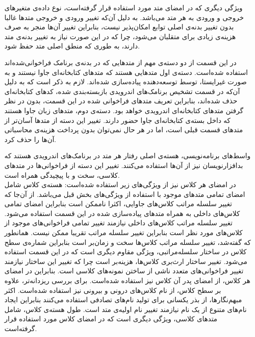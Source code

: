  ویژگی دیگری که در امضای متد مورد استفاده قرار گرفته‌است، نوع داده‌ی متغیر‌های خروجی و ورودی به هر متد می‌باشد. به دلیل آن‌که تغییر ورود‌ی و خروجی متد‌ها غالبا بدون تغییر بدنه‌ی اصلی توابع امکان‌پذیر نیست، ‌بنابراین تغییر آن‌ها منجر به صرف هزینه‌ی زیادی برای متقلبان می‌شود، چرا که در این صورت نیاز به تغییر بدنه‌ی متد دارند، به طوری که منطق اصلی متد حفظ شود.

 در این قسمت از دو دسته‌‌ی مهم از متد‌هایی که در بدنه‌ی برنامک فراخوانی‌شده‌اند استفاده شده‌است. دسته‌ی اول متد‌هایی هستند که متد‌های کتابخانه‌ای جاوا نیستند و به صورت غیرایستا،  توسط توسعه‌د‌هنده پیاده‌سازی شده‌اند. لازم به ذکر است که به دلیل آن‌که در قسمت تشخیص برنامک‌های اندرویدی بازبسته‌بندی شده، کد‌های کتابخانه‌ای حذف شده‌اند، بنابراین تعریف متد‌های فراخوانی شده در این قسمت، بدون در نظر گرفتن متد‌های کتابخانه‌ای اندرویدی خواهد بود. دسته‌ی دوم، متد‌های زبان جاوا هستند که داخل بسته‌ی کتابخانه‌ای جاوا حضور دارند. تغییر این دسته از متد‌ها آسان‌تر از متد‌های قسمت قبلی است، اما در هر حال نمی‌توان بدون پرداخت هزینه‌ی محاسباتی آن‌ها را حذف کرد.

 واسط‌های برنامه‌نویسی، هسته‌ی اصلی رفتار هر متد در برنامک‌های اندرویدی هستند که بدافزارنویسان نیز از آن‌ها استفاده می‌کنند. تغییر این دسته از فراخوانی‌ها در متد‌های کلاسی، سخت و با پیچیدگی همراه است.\\
در امضای هر کلاس نیز از ویژگی‌های زیر استفاده شده‌است: 
 هسته‌ی کلاس شامل امضای تمامی متد‌های موجود با استفاده از ویژگی‌های بخش قبل می‌باشد.
 از آن‌جا که تغییر سلسله مراتب کلاس‌های جاوایی، اکثرا ناممکن است بنابراین امضای تمامی کلاس‌های داخلی به همراه متد‌های پیاده‌سازی شده در این قسمت استفاده می‌شود. تغییر سلسله مراتب کلاس‌های داخلی نیازمند تغییر تمامی فراخوانی‌های موجود از کلاس‌های مورد نظر است بنابراین تغییر سلسله مراتب تقریبا ممکن نیست.
 همانطور که گفته‌شد، تغییر سلسله مراتب کلاس‌ها سخت و زمان‌بر است بنابراین شماره‌ی سطح کلاس در ساختار سلسله‌مراتبی، ویژگی مقاوم دیگری است که در این قسمت استفاده می‌شود.
 تغییر ساختار ارث‌بری کلاس‌ها، هزینه‌بر است چرا که تغییر این ساختار نیازمند تغییر فراخوانی‌های متعدد ناشی از ساختن نمونه‌های کلاسی است. بنابراین در امضای هر کلاس، از امضای پدر آن کلاس نیز استفاده شده‌است.
 برای بررسی ریزدانه‌تر، علاوه بر سطح کلاس، از نام کلاس‌های درونی و بیرونی نیز استفاده شده‌است. اکثر مبهم‌نگار‌ها، از بذر‌ یکسانی برای تولید نام‌های تصادفی استفاده می‌کنند بنابراین ایجاد نام‌های متنوع از یک نام نیازمند تغییر نام اولیه‌ی متد است.
 طول هسته‌ی کلاس، شامل متد‌های کلاسی، ویژگی دیگری است که در امضای کلاس مورد استفاده قرار گرفته‌است. 

